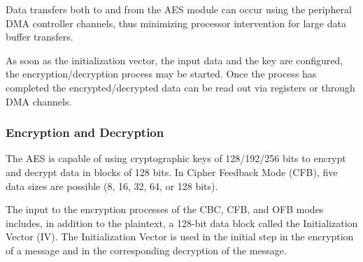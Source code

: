Data transfers both to and from the A\+E\+S module can occur using the peripheral D\+M\+A controller channels, thus minimizing processor intervention for large data buffer transfers.

As soon as the initialization vector, the input data and the key are configured, the encryption/decryption process may be started. Once the process has completed the encrypted/decrypted data can be read out via registers or through D\+M\+A channels.\hypertarget{group__asfdoc__sam0__drivers__aes__group_asfdoc_sam0_drivers_aes_module_overview_en_de}{}\subsubsection{Encryption and Decryption}\label{group__asfdoc__sam0__drivers__aes__group_asfdoc_sam0_drivers_aes_module_overview_en_de}
The A\+E\+S is capable of using cryptographic keys of 128/192/256 bits to encrypt and decrypt data in blocks of 128 bits. In Cipher Feedback Mode (C\+F\+B), five data sizes are possible (8, 16, 32, 64, or 128 bits).

The input to the encryption processes of the C\+B\+C, C\+F\+B, and O\+F\+B modes includes, in addition to the plaintext, a 128-\/bit data block called the Initialization Vector (I\+V). The Initialization Vector is used in the initial step in the encryption of a message and in the corresponding decryption of the message.


